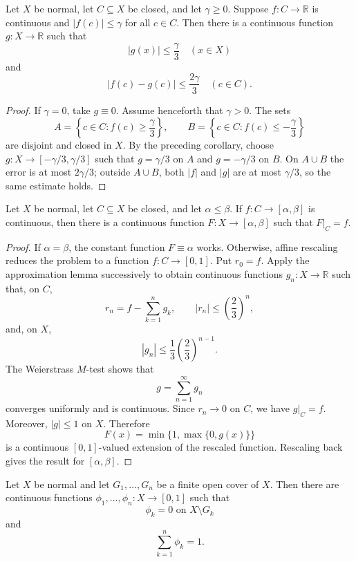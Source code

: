 \begin{lem}
Let $X$ be normal, let $C\subseteq X$ be closed, and let $\gamma\geq0$.
Suppose $f:C\to\mathbb{R}$ is continuous and $|f(c)|\leq\gamma$ for all
$c\in C$.
Then there is a continuous function $g:X\to\mathbb{R}$ such that
\[
|g(x)|\leq\frac{\gamma}{3}\quad(x\in X)
\]
and
\[
|f(c)-g(c)|\leq\frac{2\gamma}{3}\quad(c\in C).
\]
\end{lem}

\begin{proof}
If $\gamma=0$, take $g\equiv0$. Assume henceforth that $\gamma>0$. The sets
\[
A=\left\{c\in C:f(c)\geq\frac{\gamma}{3}\right\},
\qquad
B=\left\{c\in C:f(c)\leq-\frac{\gamma}{3}\right\}
\]
are disjoint and closed in $X$. By the preceding corollary, choose
$g:X\to[-\gamma/3,\gamma/3]$ such that $g=\gamma/3$ on $A$ and
$g=-\gamma/3$ on $B$. On $A\cup B$ the error is at most $2\gamma/3$; outside
$A\cup B$, both $|f|$ and $|g|$ are at most $\gamma/3$, so the same estimate
holds.
\end{proof}

\begin{thm}
Let $X$ be normal, let $C\subseteq X$ be closed, and let
$\alpha\leq\beta$. If $f:C\to[\alpha,\beta]$ is continuous, then there is
a continuous function
$F:X\to[\alpha,\beta]$ such that $F|_C=f$.
\end{thm}

\begin{proof}
If $\alpha=\beta$, the constant function $F\equiv\alpha$ works. Otherwise,
affine rescaling reduces the problem to a function $f:C\to[0,1]$. Put
$r_0=f$. Apply the approximation lemma successively to obtain continuous
functions $g_n:X\to\mathbb{R}$ such
that, on $C$,
\[
r_n=f-\sum_{k=1}^n g_k,
\qquad
|r_n|\leq\left(\frac23\right)^n,
\]
and, on $X$,
\[
|g_n|\leq\frac13\left(\frac23\right)^{n-1}.
\]
The Weierstrass $M$-test shows that
\[
g=\sum_{n=1}^{\infty}g_n
\]
converges uniformly and is continuous. Since $r_n\to0$ on $C$, we have
$g|_C=f$. Moreover, $|g|\leq1$ on $X$. Therefore
\[
F(x)=\min\{1,\max\{0,g(x)\}\}
\]
is a continuous $[0,1]$-valued extension of the rescaled function. Rescaling
back gives the result for $[\alpha,\beta]$.
\end{proof}

\begin{thm}
Let $X$ be normal and let $G_1,\ldots,G_n$ be a finite open cover of $X$.
Then there are continuous functions $\phi_1,\ldots,\phi_n:X\to[0,1]$ such
that
\[
\phi_k=0\text{ on }X\setminus G_k
\]
and
\[
\sum_{k=1}^n\phi_k=1.
\]
\end{thm}

